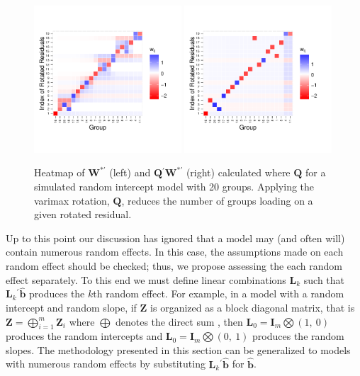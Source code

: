 \documentclass{article} %
\newcommand{\trans}{\ensuremath{^\prime}}
\begin{document}
\begin{figure}
	\centering
	\includegraphics[width=0.49\textwidth]{cartoon_heatmap_raw.pdf}
	\includegraphics[width=0.49\textwidth]{cartoon_heatmap_varimax.pdf}
	\caption{\label{fig:cartoon} Heatmap of $\bm{W}^{*\prime}$ (left) and $\bm{Q}\trans\bm{W}^{*\prime}$ (right) calculated where $\bm{Q}$ for a simulated random intercept model with 20 groups. Applying the varimax rotation, $\bm{Q}$, reduces the number of groups loading on a given rotated residual.}
\end{figure}


Up to this point our discussion has ignored that a model may (and often will) contain numerous random effects. In this case, the assumptions made on each random effect should be checked; thus, we propose assessing the each random effect separately. To this end we must define linear combinations $\bm{L}_k$ such that $\bm{L}_k\trans \widehat{\bm{b}}$ produces the $k$th random effect. For example, in a model with a random intercept and random slope, if $\bm{Z}$ is organized as a block diagonal matrix, that is $\bm{Z} = \bigoplus_{i=1}^{m} \bm{Z}_{i}$ where $\bigoplus$ denotes the direct sum \citep[page 47]{Gentle:2007}, then $\bm{L}_0 = \bm{I}_{m} \bigotimes ( 1,\ 0)$ produces the random intercepts and $\bm{L}_0 = \bm{I}_{m} \bigotimes ( 0,\ 1)$ produces the random slopes. The methodology presented in this section can be generalized to models with numerous random effects by substituting $\bm{L}_k\trans \widehat{\bm{b}}$ for $\widehat{\bm{b}}$.
\end{document}
